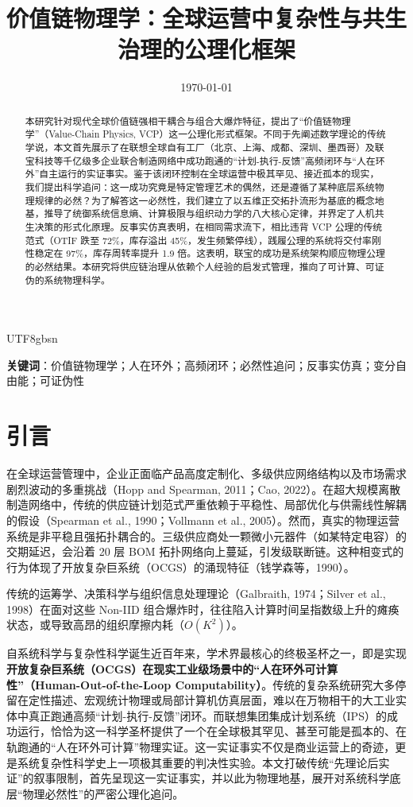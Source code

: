 \documentclass[11pt,a4paper]{article}
\title{\textbf{价值链物理学：全球运营中复杂性与共生治理的公理化框架}}
\author{} \\ 全球数字神经系统总设计部，北京，中国}
\date{\today}
\begin{document}
\begin{CJK*}{UTF8}{gbsn}

\maketitle

\begin{abstract}
本研究针对现代全球价值链强相干耦合与组合大爆炸特征，提出了“价值链物理学”（Value-Chain Physics, VCP）这一公理化形式框架。不同于先阐述数学理论的传统学说，本文首先展示了在联想全球自有工厂（北京、上海、成都、深圳、墨西哥）及联宝科技等千亿级多企业联合制造网络中成功跑通的“计划-执行-反馈”高频闭环与“人在环外”自主运行的实证事实。鉴于该闭环控制在全球运营中极其罕见、接近孤本的现实，我们提出科学追问：这一成功究竟是特定管理艺术的偶然，还是遵循了某种底层系统物理规律的必然？为了解答这一必然性，我们建立了以五维正交拓扑流形为基底的概念地基，推导了统御系统信息熵、计算极限与组织动力学的八大核心定律，并界定了人机共生决策的形式化原理。反事实仿真表明，在相同需求流下，相比违背 VCP 公理的传统范式（OTIF 跌至 72\%，库存溢出 45\%，发生频繁停线），践履公理的系统将交付率刚性稳定在 97\%，库存周转率提升 1.9 倍。这表明，联宝的成功是系统架构顺应物理公理的必然结果。本研究将供应链治理从依赖个人经验的启发式管理，推向了可计算、可证伪的系统物理科学。
\end{abstract}

\textbf{关键词}：价值链物理学；人在环外；高频闭环；必然性追问；反事实仿真；变分自由能；可证伪性

\newpage

\section{引言}
在全球运营管理中，企业正面临产品高度定制化、多级供应网络结构以及市场需求剧烈波动的多重挑战（Hopp and Spearman, 2011；Cao, 2022）。在超大规模离散制造网络中，传统的供应链计划范式严重依赖于平稳性、局部优化与供需线性解耦的假设（Spearman et al., 1990；Vollmann et al., 2005）。然而，真实的物理运营系统是非平稳且强拓扑耦合的。三级供应商处一颗微小元器件（如某特定电容）的交期延迟，会沿着 20 层 BOM 拓扑网络向上蔓延，引发级联断链。这种相变式的行为体现了开放复杂巨系统（OCGS）的涌现特征（钱学森等，1990）。

传统的运筹学、决策科学与组织信息处理理论（Galbraith, 1974；Silver et al., 1998）在面对这些 Non-IID 组合爆炸时，往往陷入计算时间呈指数级上升的瘫痪状态，或导致高昂的组织摩擦内耗（$O(K^2)$）。

自系统科学与复杂性科学诞生近百年来，学术界最核心的终极圣杯之一，即是实现\textbf{开放复杂巨系统（OCGS）在现实工业级场景中的“人在环外可计算性”（Human-Out-of-the-Loop Computability）}。传统的复杂系统研究大多停留在定性描述、宏观统计物理或局部计算机仿真层面，难以在万物相干的大工业实体中真正跑通高频“计划-执行-反馈”闭环。而联想集团集成计划系统（IPS）的成功运行，恰恰为这一科学圣杯提供了一个在全球极其罕见、甚至可能是孤本的、在轨跑通的“人在环外可计算”物理实证。这一实证事实不仅是商业运营上的奇迹，更是系统复杂性科学史上一项极其重要的判决性实验。本文打破传统“先理论后实证”的叙事限制，首先呈现这一实证事实，并以此为物理地基，展开对系统科学底层“物理必然性”的严密公理化追问。


\end{CJK*}
\end{document}
